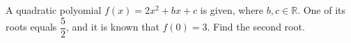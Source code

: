 A quadratic polyomial $f(x)=2x^{2}+bx+c$ is given, where $b, c\in\mathbb{R}$. One of its roots equals $\dfrac{5}{2}$, and it is known that $f(0)=3$. Find the second root.
